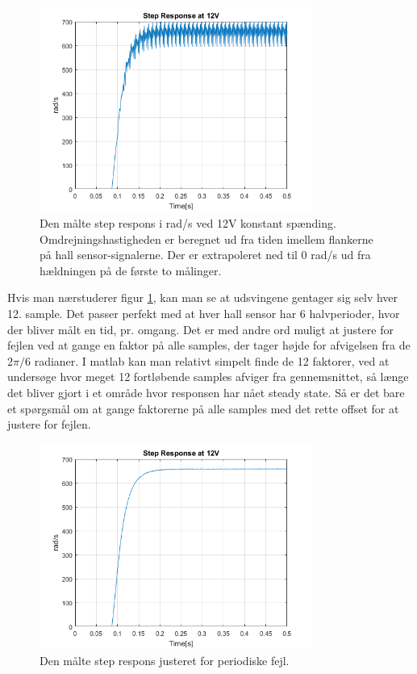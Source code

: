 \begin{figure}[!ht]
	\begin{center}
		\includegraphics[width=0.8\textwidth]{Billeder/Untreated_Response.png}
	\end{center}
\caption{Den målte step respons i rad/s ved 12V konstant spænding. Omdrejningshastigheden er beregnet ud fra tiden imellem flankerne på hall sensor-signalerne. Der er extrapoleret ned til 0 rad/s ud fra hældningen på de første to målinger.}
\label{fig:Ubehandlet}
\end{figure}

Hvis man nærstuderer figur \ref{fig:Ubehandlet}, kan man se at udsvingene gentager sig selv hver 12. sample. Det passer perfekt med at hver hall sensor har 6 halvperioder, hvor der bliver målt en tid, pr. omgang. Det er med andre ord muligt at justere for fejlen ved at gange en faktor på alle samples, der tager højde for afvigelsen fra de $2\pi/6$ radianer. I matlab kan man relativt simpelt finde de 12 faktorer, ved at undersøge hvor meget 12 fortløbende samples afviger fra gennemsnittet, så længe det bliver gjort i et område hvor responsen har nået steady state. Så er det bare et spørgsmål om at gange faktorerne på alle samples med det rette offset for at justere for fejlen. 

\begin{figure}[!ht]
	\begin{center}
		\includegraphics[width=0.8\textwidth]{Billeder/Treated_Response.png}
	\end{center}
\caption{Den målte step respons justeret for periodiske fejl.}
\label{fig:Behandlet}
\end{figure}

